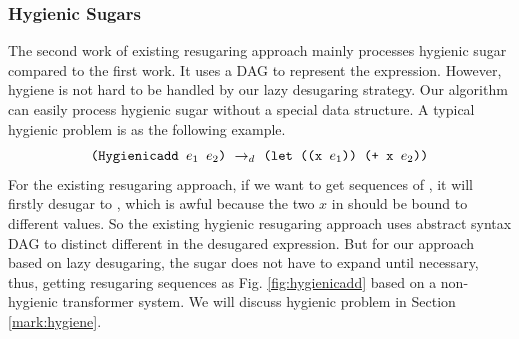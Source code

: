 \subsubsection{Hygienic Sugars}
\label{mark:hygienic}


The second work \cite{hygienic} of existing resugaring approach mainly processes hygienic sugar compared to the first work. It uses a DAG to represent the expression. However, hygiene is not hard to be handled by our lazy desugaring strategy. Our algorithm can easily process hygienic sugar without a special data structure.
A typical hygienic problem is as the following example.
\[
\texttt{(Hygienicadd $e_1$ $e_2$)} ~\rightarrow_d~ \texttt{(let ((x $e_1$)) (+ x $e_2$))}
\]
For the existing resugaring approach, if we want to get sequences of , it will firstly desugar to , which is awful because the two $x$ in  should be bound to different values. So the existing hygienic resugaring approach uses abstract syntax DAG to distinct different  in the desugared expression. But for our approach based on lazy desugaring, the  sugar does not have to expand until necessary, thus, getting resugaring sequences as Fig.  \ref{fig:hygienicadd} based on a non-hygienic transformer system. We will discuss hygienic problem in Section \ref{mark:hygiene}.



